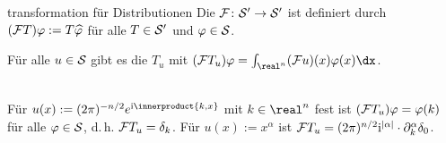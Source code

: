 \begin{Def}{transformation für Distributionen}
    Die  $\F\colon \S' \rightarrow \S'$ ist definiert durch
    $(\F T)\varphi := T \widehat{\varphi}$ für alle $T \in \S'$ und $\varphi \in \S$.
\end{Def}

\begin{Bem}
    Für alle $u \in \S$ gibt es die  $T_u$
    mit $(\F T_u) \varphi = \int_{\real^n} (\F u)(x) \varphi(x)\dx$.
\end{Bem}

\begin{Bsp}\\
    Für $u(x) := (2\pi)^{-n/2} e^{\iu\innerproduct{k,x}}$ mit $k \in \real^n$ fest ist
    $(\F T_u)\varphi = \varphi(k)$ für alle $\varphi \in \S$, d.\,h. $\F T_u = \delta_k$.
    Für $u(x) := x^\alpha$ ist
    $\F T_u = (2\pi)^{n/2} \iu^{|\alpha|} \cdot \partial_k^\alpha \delta_0$.
\end{Bsp}

\pagebreak
